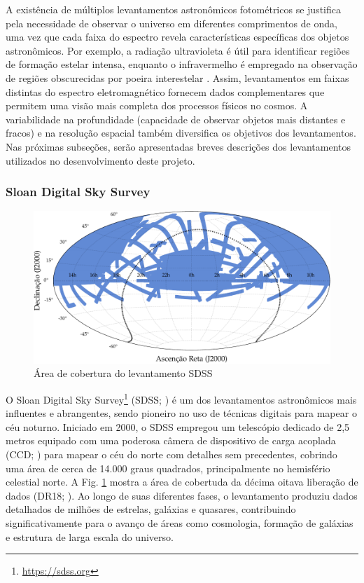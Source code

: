 A existência de múltiplos levantamentos astronômicos fotométricos se justifica pela necessidade de observar o universo em diferentes comprimentos de onda, uma vez que cada faixa do espectro revela características específicas dos objetos astronômicos. Por exemplo, a radiação ultravioleta é útil para identificar regiões de formação estelar intensa, enquanto o infravermelho é empregado na observação de regiões obscurecidas por poeira interestelar \citep[p. 28-31]{extragalactic-astronomy-book}. Assim, levantamentos em faixas distintas do espectro eletromagnético fornecem dados complementares que permitem uma visão mais completa dos processos físicos no cosmos. A variabilidade na profundidade (capacidade de observar objetos mais distantes e fracos) e na resolução espacial também diversifica os objetivos dos levantamentos. Nas próximas subseções, serão apresentadas breves descrições dos levantamentos utilizados no desenvolvimento deste projeto.


\subsubsection{Sloan Digital Sky Survey}
\label{sec:sdss}

\begin{figure}[!ht]
  \includegraphics[width=\linewidth]{notebooks/plots/sdss_footprint.pdf}
  \caption{Área de cobertura do levantamento SDSS}
  \label{fig:coverage-sdss}
\end{figure}

O Sloan Digital Sky Survey\footnote{\url{https://sdss.org}} (SDSS; \citealp{sdss}) é um dos levantamentos astronômicos mais influentes e abrangentes, sendo pioneiro no uso de técnicas digitais para mapear o céu noturno. Iniciado em 2000, o SDSS empregou um telescópio dedicado de 2,5 metros \citep{sdss-telescope} equipado com uma poderosa câmera de dispositivo de carga acoplada (CCD;  \citealp{sdss-camera}) para mapear o céu do norte com detalhes sem precedentes, cobrindo uma área de cerca de 14.000 graus quadrados, principalmente no hemisfério celestial norte. A Fig. \ref{fig:coverage-sdss} mostra a área de cobertuda da décima oitava liberação de dados (DR18; \citealp{sdss-dr18}). Ao longo de suas diferentes fases, o levantamento produziu dados detalhados de milhões de estrelas, galáxias e quasares, contribuindo significativamente para o avanço de áreas como cosmologia, formação de galáxias e estrutura de larga escala do universo.

